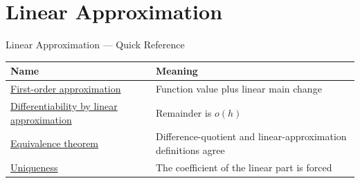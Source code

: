 \section{Linear Approximation}

\begin{toolkitbox}{Linear Approximation --- Quick Reference}
\small
\begin{tabular}{l l}
\toprule
\textbf{Name} & \textbf{Meaning} \\
\midrule
\hyperref[def:first-order-approximation-at-a-point]{First-order approximation} & Function value plus linear main change \\
\hyperref[def:differentiability-linear-approximation]{Differentiability by linear approximation} & Remainder is $o(h)$ \\
\hyperref[thm:derivative-linear-approximation-equivalence]{Equivalence theorem} & Difference-quotient and linear-approximation definitions agree \\
\hyperref[prop:linear-approximation-unique]{Uniqueness} & The coefficient of the linear part is forced \\
\bottomrule
\end{tabular}
\end{toolkitbox}


